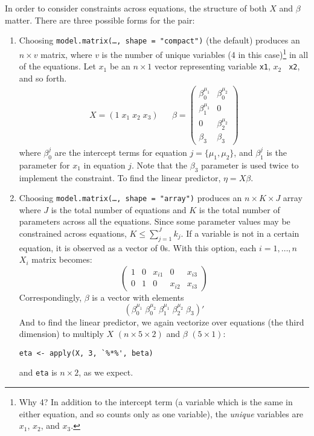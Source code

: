 \documentclass[oneside,letterpaper,12pt]{article}
\begin{document}
In order to consider constraints across equations, the structure of
both $X$ and $\beta$ matter.  There are three possible forms for the
pair:  
\begin{enumerate}

\item  Choosing {\tt model.matrix(\dots, shape = "compact")} (the
default) produces an $n \times v$ matrix, where $v$ is the number of
unique variables (4 in this case)\footnote{Why 4? In addition to the
intercept term (a variable which is the same in either equation, and
so counts only as one variable), the \emph{unique} variables are
$x_1$, $x_2$, and $x_3$.} in all of the equations.  Let $x_1$
be an $n \times 1$ vector representing variable {\tt x1}, $x_2$ {\tt
x2}, and so forth.
\begin{eqnarray*}
X = (1 \; x_1 \; x_2 \; x_3) & & \beta = \left(
\begin{array}{cc}
\beta_0^{\mu_1}       & \beta_0^{\mu_2} \\
\beta_1^{\mu_1}       & 0 \\
0                     & \beta_2^{\mu_2} \\
\beta_3               & \beta_3
\end{array} \right) 
\end{eqnarray*}
where $\beta_0^j$ are the intercept terms for equation $j = \{\mu_1,
\mu_2\}$, and $\beta_1^j$ is the parameter for $x_1$ in equation $j$.
Note that the $\beta_3$ parameter is used twice to implement the
constraint.  To find the linear predictor, $\eta = X \beta$.  

\item Choosing {\tt model.matrix(\dots, shape = "array")} produces an
$n \times K \times J$ array where $J$ is the total number of equations
and $K$ is the total number of parameters across all the equations.
Since some parameter values may be constrained across equations, $K
\leq \sum_{j=1}^J k_j$.  If a variable is not in a certain equation,
it is observed as a vector of 0s.  With this option, each $i = 1,
\dots, n$ $X_i$ matrix becomes:
\begin{equation*}
\left( \begin{array}{ccccc}
1 & 0 & x_{i1} & 0       & x_{i3}  \\
0 & 1 & 0      & x_{i2}  & x_{i3} 
\end{array} \right) 
\end{equation*}
Correspondingly, $\beta$ is a vector with elements
\begin{equation*}
(\beta_0^{\mu_1} \; \beta_0^{\mu_2} \; \beta_1^{\mu_1} \;
\beta_2^{\mu_2} \; \beta_3)'
\end{equation*}
And to find the linear predictor, we again vectorize over equations
(the third dimension) to multiply $X$ $(n \times 5 \times 2)$ and
$\beta$ $(5 \times 1)$:
\begin{verbatim}
eta <- apply(X, 3, `%*%', beta)
\end{verbatim}  
and {\tt eta} is $n \times 2$, as we expect.  


\end{enumerate}
\end{document}
